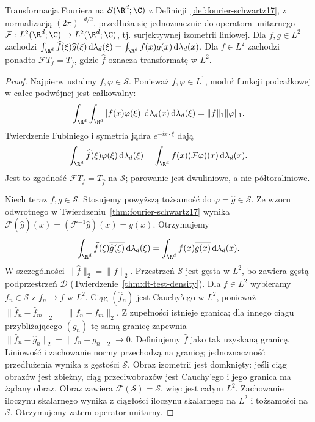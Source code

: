 \begin{twierdzenie}
\label{thm:plancherel22}
Transformacja Fouriera na $\mathcal S(\R^d;\C)$
z Definicji~\ref{def:fourier-schwartz17}, z normalizacją
$(2\pi)^{-d/2}$, przedłuża się jednoznacznie do operatora unitarnego
$\mathcal F:L^2(\R^d;\C)\to L^2(\R^d;\C)$,
tj. surjektywnej izometrii liniowej. Dla $f,g\in L^2$ zachodzi
$\int_{\R^d}\widehat f(\xi)\overline{\widehat g(\xi)}
\,\mathrm d\lambda_d(\xi)
=\int_{\R^d}f(x)\overline{g(x)}\,\mathrm d\lambda_d(x)$.
Dla $f\in L^2$ zachodzi ponadto
$\mathcal F T_f=T_{\widehat f}$, gdzie $\widehat f$
oznacza transformatę w $L^2$.
\end{twierdzenie}
\begin{proof}
Najpierw ustalmy $f,\varphi\in\mathcal S$.
Ponieważ $f,\varphi\in L^1$, moduł funkcji
podcałkowej w całce podwójnej jest całkowalny:
\[
 \int_{\R^d}\int_{\R^d}|f(x)\varphi(\xi)|
 \,\mathrm d\lambda_d(x)\,\mathrm d\lambda_d(\xi)
 =\|f\|_1\|\varphi\|_1.
\]
Twierdzenie Fubiniego i symetria jądra
$e^{-ix\cdot\xi}$ dają
\[
 \int_{\R^d}\widehat f(\xi)\varphi(\xi)
 \,\mathrm d\lambda_d(\xi)
 =\int_{\R^d}f(x)(\mathcal F\varphi)(x)
 \,\mathrm d\lambda_d(x).
\]
Jest to zgodność $\mathcal F T_f=T_{\widehat f}$ na
$\mathcal S$; parowanie jest dwuliniowe, a nie
półtoraliniowe.

Niech teraz $f,g\in\mathcal S$. Stosujemy powyższą
tożsamość do $\varphi=\overline{\widehat g}\in\mathcal S$.
Ze wzoru odwrotnego w Twierdzeniu~\ref{thm:fourier-schwartz17}
wynika
$\mathcal F(\overline{\widehat g})(x)
=\overline{(\mathcal F^{-1}\widehat g)(x)}
=\overline{g(x)}$.
Otrzymujemy
\[
 \int_{\R^d}\widehat f(\xi)\overline{\widehat g(\xi)}
 \,\mathrm d\lambda_d(\xi)
 =\int_{\R^d}f(x)\overline{g(x)}\,\mathrm d\lambda_d(x).
\]
W szczególności $\|\widehat f\|_2=\|f\|_2$.
Przestrzeń $\mathcal S$ jest gęsta w $L^2$, bo zawiera
gęstą podprzestrzeń $\mathcal D$
(Twierdzenie~\ref{thm:dt-test-density}). Dla $f\in L^2$
wybieramy $f_n\in\mathcal S$ z $f_n\to f$ w $L^2$.
Ciąg $(\widehat f_n)$ jest Cauchy'ego w $L^2$,
ponieważ $\|\widehat f_n-\widehat f_m\|_2
=\|f_n-f_m\|_2$. Z zupełności istnieje granica;
dla innego ciągu przybliżającego $(g_n)$ tę samą granicę
zapewnia $\|\widehat f_n-\widehat g_n\|_2
=\|f_n-g_n\|_2\to0$. Definiujemy $\widehat f$ jako
tak uzyskaną granicę. Liniowość i zachowanie normy
przechodzą na granicę; jednoznaczność przedłużenia
wynika z gęstości $\mathcal S$.
Obraz izometrii jest domknięty: jeśli ciąg obrazów
jest zbieżny, ciąg przeciwobrazów jest Cauchy'ego i
jego granica ma żądany obraz. Obraz zawiera
$\mathcal F(\mathcal S)=\mathcal S$, więc jest całym
$L^2$. Zachowanie iloczynu skalarnego wynika z ciągłości
iloczynu skalarnego na $L^2$ i tożsamości na $\mathcal S$.
Otrzymujemy zatem operator unitarny.


\end{proof}

